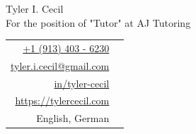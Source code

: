 \documentclass[sans, a4paper, 11pt]{article}
\newcommand{\cvcolor}[1]{{\color{MidnightBlue}#1}}
\begin{document}
\noindent
\begin{minipage}{0.675\linewidth}
  \vspace{1.75em}
  {
    \fontsize{40pt}{50pt}\selectfont
    \noindent
    Tyler I. Cecil
  }\\
  {\Large \color{darkgray}
    {
      \noindent
      For the position of "Tutor" at AJ Tutoring
    }
  }
\end{minipage}
\hfill
\begin{tabular}{|rl}
  \href{tel:+1 (913) 403 - 6230}{+1 (913) 403 - 6230}&\cvcolor{\faPhone} \\
  \href{mailto:tyler.i.cecil@gmail.com}{tyler.i.cecil@gmail.com}&\cvcolor{\faEnvelope} \\
  \href{https://www.linkedin.com/in/tyler-cecil/}{in/tyler-cecil}&\cvcolor{\faLinkedinSquare} \\
  \href{https://tylercecil.com}{https://tylercecil.com}&\cvcolor{\faGlobe} \\
  English, German & \cvcolor{\faLanguage} \\
\end{tabular}

\vspace{0.5em}
\noindent\hrulefill
\vspace{1em}
\end{document}
